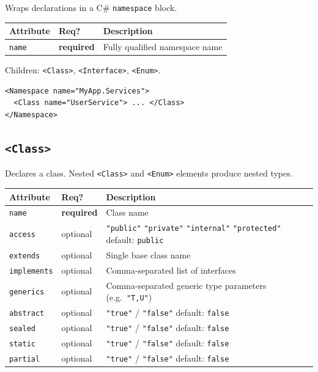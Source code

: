 \documentclass[11pt,a4paper]{article}
\newcommand{\el}[1]{\texttt{\textcolor{xoop-keyword}{<#1>}}}
\newcommand{\attr}[1]{\texttt{\textcolor{xoop-attr}{#1}}}
\newcommand{\val}[1]{\texttt{\textcolor{xoop-string}{"#1"}}}
\newcommand{\cs}[1]{\texttt{#1}}
\newcommand{\required}{\textcolor{xoop-red}{\textbf{required}}}
\newcommand{\optional}{\textcolor{xoop-green}{optional}}
\newcommand{\default}[1]{\textcolor{xoop-green}{default: \texttt{#1}}}
\begin{document}
Wraps declarations in a C\# \cs{namespace} block.

\begin{center}
\begin{tabular}{lll}
\toprule
Attribute & Req? & Description \\
\midrule
\attr{name} & \required & Fully qualified namespace name \\
\bottomrule
\end{tabular}
\end{center}

Children: \el{Class}, \el{Interface}, \el{Enum}.

\begin{lstlisting}[caption={Namespace declaration}]
<Namespace name="MyApp.Services">
  <Class name="UserService"> ... </Class>
</Namespace>
\end{lstlisting}

\subsection{\el{Class}}

Declares a class. Nested \el{Class} and \el{Enum} elements produce nested types.

\begin{center}
\begin{tabularx}{\linewidth}{llX}
\toprule
Attribute & Req? & Description \\
\midrule
\attr{name}       & \required & Class name \\
\attr{access}     & \optional & \val{public} \textbar{} \val{private} \textbar{} \val{internal} \textbar{} \val{protected} \quad \default{public} \\
\attr{extends}    & \optional & Single base class name \\
\attr{implements} & \optional & Comma-separated list of interfaces \\
\attr{generics}   & \optional & Comma-separated generic type parameters (e.g.\ \val{T,U}) \\
\attr{abstract}   & \optional & \val{true} / \val{false} \quad \default{false} \\
\attr{sealed}     & \optional & \val{true} / \val{false} \quad \default{false} \\
\attr{static}     & \optional & \val{true} / \val{false} \quad \default{false} \\
\attr{partial}    & \optional & \val{true} / \val{false} \quad \default{false} \\
\bottomrule
\end{tabularx}
\end{center}
\end{document}
